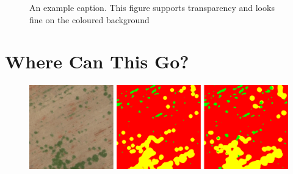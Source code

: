 \documentclass[
]{dtuposter}
\begin{document}
\begin{dtupostercontent}
\begin{figure}
	\centering
{}
\caption{An example caption. This figure supports transparency and looks fine on 
the coloured background}\label{fig:example}
\end{figure}


\section{Where Can This Go?}

\begin{figure}
	\begin{fadebox}\begin{center}
			\includegraphics[width=\linewidth,origin=c]{reconst}
	\end{center}\end{fadebox}
\end{figure}


\end{dtupostercontent}
\end{document}
